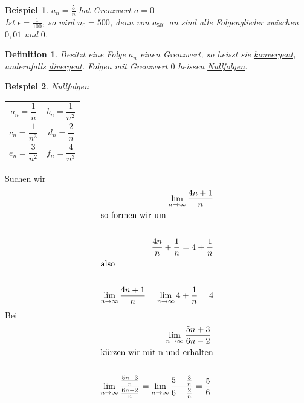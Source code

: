 \documentclass{report}
\newtheorem{mydef}{Definition}
\newtheorem{myexample}{Beispiel}
\begin{document}
\begin{myexample}$a_n = \frac{5}{n}$ hat Grenzwert $a=0$\\
Ist $\epsilon = \frac{1}{100}$, so wird $n_0 = 500$, denn von $a_{501}$ an sind alle Folgenglieder zwischen $0,01$ und $0$.\end{myexample}
\begin{mydef}Besitzt eine Folge $a_n$ einen Grenzwert, so heisst sie \underline{konvergent}, andernfalls \underline{divergent}. Folgen mit Grenzwert $0$ heissen \underline{Nullfolgen}.\end{mydef}
\begin{myexample}Nullfolgen\\
	\begin{tabularx}{\textwidth}{XX}
		\begin{equation*}a_n = \frac{1}{n}\end{equation*}&\begin{equation*}b_n = \frac{1}{n^2}\end{equation*}\\
		\begin{equation*}c_n = \frac{1}{n^3}\end{equation*}&\begin{equation*}d_n = \frac{2}{n}\end{equation*}\\
		\begin{equation*}e_n = \frac{3}{n^2}\end{equation*}&\begin{equation*}f_n = \frac{4}{n^3}\end{equation*}
	\end{tabularx}
\end{myexample}
\noindent
Suchen wir
\begin{eqnarray*} 
	\lim_{n \to \infty} \frac{4n+1}{n}\\	
	\shortintertext{so formen wir um}\\
	\frac{4n}{n}+ \frac{1}{n} = 4 + \frac{1}{n}\\
	\shortintertext{also}\\
	\lim_{n \to \infty} \frac{4n +1}{n} = \lim_{n \to \infty}4+\frac{1}{n} = 4
\end{eqnarray*}
Bei
\begin{eqnarray*}
	\lim_{n \to \infty}\frac{5n+3}{6n-2}\\
	\shortintertext{kürzen wir mit n und erhalten}\\
	\lim_{n \to \infty}\frac{\frac{5n+3}{n}}{\frac{6n-2}{n}} = \lim_{n \to \infty}\frac{5+\frac{3}{n}}{6 -\frac{2}{n}} = \frac{5}{6}
\end{eqnarray*}
\end{document}
